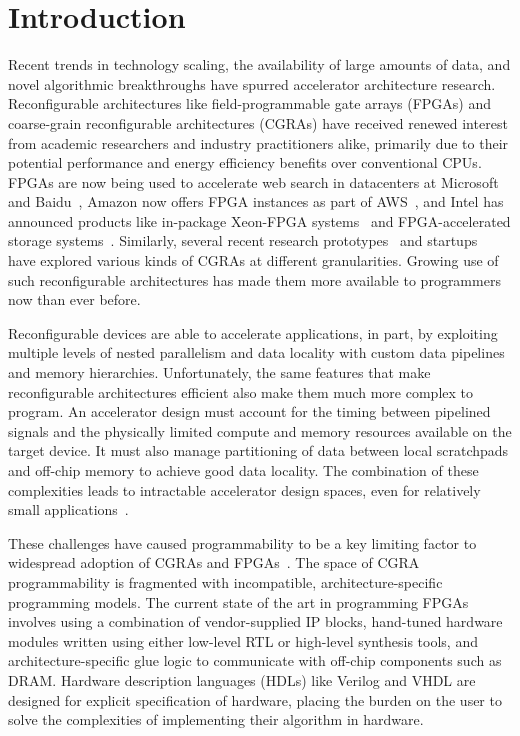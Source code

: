 \chapter{Introduction}
\label{intro}

Recent trends in technology scaling, the availability of large amounts of data, and novel algorithmic breakthroughs
have spurred accelerator architecture research. Reconfigurable architectures like field-programmable gate arrays (FPGAs) and coarse-grain reconfigurable  architectures (CGRAs)
have received renewed interest from academic researchers and industry practitioners alike, primarily due to their potential performance and energy efficiency benefits over conventional CPUs.
FPGAs are now being used to accelerate web search
in datacenters at Microsoft and Baidu~\cite{catapult, baidu},
Amazon now offers FPGA instances as part of AWS~\cite{awsf1},
and Intel has announced products like in-package Xeon-FPGA systems~\cite{harp}
and FPGA-accelerated storage systems~\cite{nand_flash}.
Similarly, several recent research prototypes~\cite{dyser, ti, scaledeep, scnn, plasticine}
and startups~\cite{wavecomp, nervana} have explored various
kinds of CGRAs at different granularities.
Growing use of such reconfigurable architectures has made them more available to programmers now than ever before.


Reconfigurable devices are able to accelerate applications, in part, by exploiting multiple
levels of nested parallelism and data locality with custom data pipelines and memory hierarchies.
Unfortunately, the same features that make reconfigurable architectures efficient
also make them much more complex to program. An accelerator design must account for the timing between pipelined signals and
the physically limited compute and memory resources available on the target device.
It must also manage partitioning of data between local scratchpads and off-chip memory to achieve good data locality.
The combination of these complexities leads to intractable accelerator design spaces, even for relatively small applications~\cite{cascaval}.


These challenges have caused programmability to be a key limiting factor to widespread adoption of CGRAs and FPGAs~\cite{fpgaMasses,DeSutter2013}.
The space of CGRA programmability is fragmented with incompatible, architecture-specific programming models.
The current state of the art in programming FPGAs involves using a combination of vendor-supplied IP blocks,
hand-tuned hardware modules written using either low-level RTL or high-level synthesis tools,
and architecture-specific glue logic to communicate with off-chip components such as DRAM.
Hardware description languages (HDLs) like Verilog and VHDL are designed for explicit specification of hardware,
placing the burden on the user to solve the complexities of implementing their algorithm in hardware.

